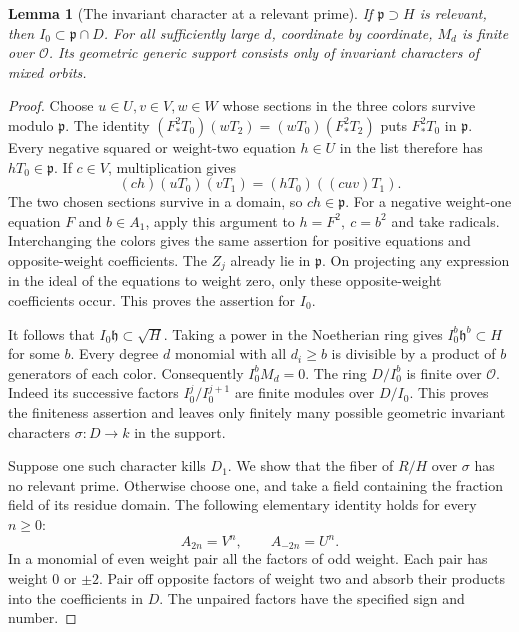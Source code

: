 \documentclass[a4paper,11pt]{article}
\newtheorem{lemma}[proposition]{Lemma}
\theoremstyle{definition}
\theoremstyle{remark}
\numberwithin{equation}{section}
\newcommand{\OO}{\mathcal O}
\begin{document}
\begin{lemma}[The invariant character at a relevant prime]\label{lem:support35}
If \(\mathfrak p\supset H\) is relevant, then \(I_0\subset\mathfrak p\cap D\). For all sufficiently large \(d\), coordinate by coordinate, \(M_d\) is finite over \(\OO\). Its geometric generic support consists only of invariant characters of mixed orbits.
\end{lemma}
\begin{proof}
Choose \(u\in U,v\in V,w\in W\) whose sections in the three colors survive modulo \(\mathfrak p\). The identity \((F_*^2 T_0)(wT_2)=(wT_0)(F_*^2T_2)\) puts \(F_*^2T_0\) in \(\mathfrak p\). Every negative squared or weight-two equation \(h\in U\) in the list therefore has \(hT_0\in\mathfrak p\). If \(c\in V\), multiplication gives
\[
 (ch)(uT_0)(vT_1)=(hT_0)((cuv)T_1).
\]
The two chosen sections survive in a domain, so \(ch\in\mathfrak p\). For a negative weight-one equation \(F\) and \(b\in A_1\), apply this argument to \(h=F^2,\ c=b^2\) and take radicals. Interchanging the colors gives the same assertion for positive equations and opposite-weight coefficients. The \(Z_j\) already lie in \(\mathfrak p\). On projecting any expression in the ideal of the equations to weight zero, only these opposite-weight coefficients occur. This proves the assertion for \(I_0\).

It follows that \(I_0\mathfrak h\subset\sqrt H\). Taking a power in the Noetherian ring gives \(I_0^b\mathfrak h^b\subset H\) for some \(b\). Every degree \(d\) monomial with all \(d_i\ge b\) is divisible by a product of \(b\) generators of each color. Consequently \(I_0^b M_d=0\). The ring \(D/I_0^b\) is finite over \(\OO\). Indeed its successive factors \(I_0^j/I_0^{j+1}\) are finite modules over \(D/I_0\). This proves the finiteness assertion and leaves only finitely many possible geometric invariant characters \(\sigma:D\to k\) in the support.

Suppose one such character kills \(D_1\). We show that the fiber of \(R/H\) over \(\sigma\) has no relevant prime. Otherwise choose one, and take a field containing the fraction field of its residue domain. The following elementary identity holds for every \(n\ge0\):
\[
                      A_{2n}=V^n,\qquad A_{-2n}=U^n .
\]
In a monomial of even weight pair all the factors of odd weight. Each pair has weight \(0\) or \(\pm2\). Pair off opposite factors of weight two and absorb their products into the coefficients in \(D\). The unpaired factors have the specified sign and number.


\end{proof}
\end{document}
